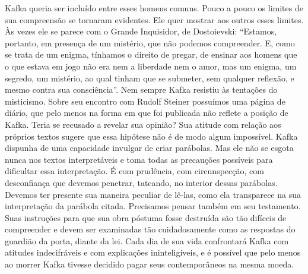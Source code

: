 Kafka queria ser incluído entre esses homens comuns. Pouco a pouco os
limites de sua compreensão se tornaram evidentes. Ele quer mostrar aos
outros esses limites. Às vezes ele se parece com o Grande Inquisidor, de
Dostoievski: ``Estamos, portanto, em presença de um mistério, que não
podemos compreender. E, como se trata de um enigma, tínhamos o direito
de pregar, de ensinar aos homens que o que estava em jogo não era nem a
liberdade nem o amor, mas um enigma, um segredo, um mistério, ao qual
tinham que se submeter, sem qualquer reflexão, e mesmo contra sua
consciência''. Nem sempre Kafka resistiu às tentações do misticismo.
Sobre seu encontro com Rudolf Steiner possuímos uma página de diário,
que pelo menos na forma em que foi publicada não reflete a posição de
Kafka. Teria se recusado a revelar sua opinião? Sua atitude com relação
aos próprios textos sugere que essa hipótese não é de modo algum
impossível. Kafka dispunha de uma capacidade invulgar de criar
parábolas. Mas ele não se esgota nunca nos textos interpretáveis e toma
todas as precauções possíveis para dificultar essa interpretação. É com
prudência, com circunspecção, com desconfiança que devemos penetrar,
tateando, no interior dessas parábolas. Devemos ter presente sua maneira
peculiar de lê-las, como ela transparece na sua interpretação da
parábola citada. Precisamos pensar também em seu testamento. Suas
instruções para que sua obra póstuma fosse destruída são tão difíceis de
compreender e devem ser examinadas tão cuidadosamente como as respostas
do guardião da porta, diante da lei. Cada dia de sua vida confrontará
Kafka com atitudes indecifráveis e com explicações ininteligíveis, e é
possível que pelo menos ao morrer Kafka tivesse decidido pagar seus
contemporâneos na mesma moeda.

